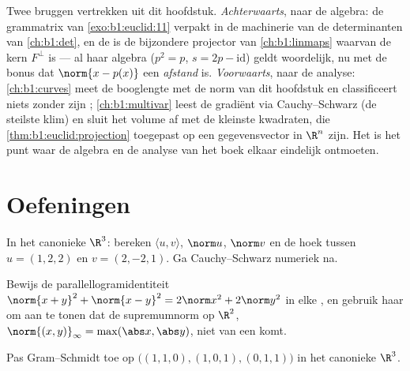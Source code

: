 \begin{remark}
\label{rem:b1:euclid:perspectives}
Twee bruggen vertrekken uit dit hoofdstuk. \emph{Achterwaarts},
naar de  algebra: de grammatrix van
\cref{exo:b1:euclid:11} verpakt  in de
machinerie van de determinanten van \cref{ch:b1:det}, en de
 is de bijzondere projector van
\cref{ch:b1:linmaps} waarvan de kern $F^\perp$ is --- al haar
algebra ($p^2 = p$, $s = 2p - \mathrm{id}$) geldt woordelijk, nu
met de bonus dat $\norm{x - p(x)}$ een \emph{afstand} is.
\emph{Voorwaarts}, naar de analyse: \cref{ch:b1:curves} meet de
booglengte met de norm van dit hoofdstuk en classificeert niets
zonder zijn ; \cref{ch:b1:multivar} leest de gradiënt
via Cauchy--Schwarz (de steilste klim) en sluit het volume af met
de kleinste kwadraten, die \cref{thm:b1:euclid:projection}
toegepast op een gegevensvector in $\R^n$ zijn. Het  is het punt waar de algebra en de analyse van het boek
elkaar eindelijk ontmoeten.
\end{remark}

\section{Oefeningen}

\begin{exercise}[$\star$]\label{exo:b1:euclid:1}
In het canonieke $\R^3$: bereken $\langle u, v\rangle$, $\norm u$,
$\norm v$ en de hoek tussen $u = (1, 2, 2)$ en $v = (2, -2, 1)$.
Ga Cauchy--Schwarz numeriek na.
\end{exercise}

\begin{exercise}[$\star$]\label{exo:b1:euclid:2}
Bewijs de parallellogramidentiteit $\norm{x+y}^2 + \norm{x-y}^2 =
2\norm x^2 + 2\norm y^2$ in elke , en gebruik
haar om aan te tonen dat de supremumnorm op $\R^2$,
$\norm{(x,y)}_\infty = \max(\abs x, \abs y)$, niet van een
 komt.
\end{exercise}

\begin{exercise}[$\star$]\label{exo:b1:euclid:3}
Pas Gram--Schmidt toe op $\bigl((1,1,0), (1,0,1), (0,1,1)\bigr)$ in
het canonieke $\R^3$.
\end{exercise}

